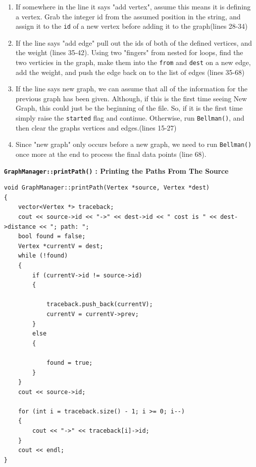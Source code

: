 \documentclass[letterpaper, 10pt]{article}
\begin{document}
\begin{enumerate}
    \item If somewhere in the line it says "add vertex", assume this means it is defining a vertex. Grab the integer id from the assumed position in the string, and assign it to the \texttt{id} of a new vertex before adding it to the graph(lines 28-34)
    \item If the line says "add edge" pull out the ids of both of the defined vertices, and the weight (lines 35-42). Using two "fingers" from nested for loops, find the two verticies in the graph, make them into the \texttt{from} and \texttt{dest} on a new edge, add the weight, and push the edge back on to the list of edges (lines 35-68)
    \item If the line says new graph, we can assume that all of the information for the previous graph has been given. Although, if this is the first time seeing New Graph, this could just be the beginning of the file. So, if it is the first time simply raise the \texttt{started} flag and continue. Otherwise, run \texttt{Bellman()}, and then clear the graphs vertices and edges.(lines 15-27)
    \item Since "new graph" only occurs before a new graph, we need to run \texttt{Bellman()} once more at the end to process the final data points (line 68).
\end{enumerate}

\textbf{\texttt{GraphManager::printPath()} : Printing the Paths From The Source }
 \begin{addmargin}[-5em]{1em}
\begin{small}
\begin{verbatim}
void GraphManager::printPath(Vertex *source, Vertex *dest)
{
	vector<Vertex *> traceback;
	cout << source->id << "->" << dest->id << " cost is " << dest->distance << "; path: ";
	bool found = false;
	Vertex *currentV = dest;
	while (!found)
	{
		if (currentV->id != source->id)
		{
			
			traceback.push_back(currentV);
			currentV = currentV->prev;
		}
		else
		{
			
			found = true;
		}
	}
	cout << source->id;

	for (int i = traceback.size() - 1; i >= 0; i--)
	{
		cout << "->" << traceback[i]->id;
	}
	cout << endl;
}

\end{verbatim}
\end{small}
\end{addmargin}   
\end{document}

